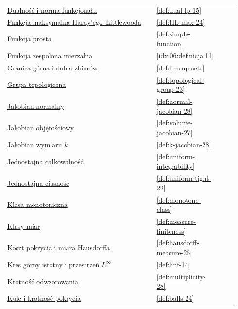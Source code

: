 \documentclass[11pt,a4paper,oneside]{book}
\numberwithin{equation}{chapter}
\theoremstyle{plain}
\theoremstyle{definition}
\theoremstyle{remark}
\begin{document}
\begin{longtable}{@{}p{0.72\linewidth}p{0.135\linewidth}p{0.08\linewidth}@{}}
\hyperref[def:dual-lp-15]{Dualność i norma funkcjonału} & \ref*{def:dual-lp-15} & \pageref*{def:dual-lp-15} \\
\hyperref[def:HL-max-24]{Funkcja maksymalna Hardy'ego--Littlewooda} & \ref*{def:HL-max-24} & \pageref*{def:HL-max-24} \\
\hyperref[def:simple-function]{Funkcja prosta} & \ref*{def:simple-function} & \pageref*{def:simple-function} \\
\hyperref[idx:06:definicja:11]{Funkcja zespolona mierzalna} & \ref*{idx:06:definicja:11} & \pageref*{idx:06:definicja:11} \\
\hyperref[def:limsup-sets]{Granica górna i dolna zbiorów} & \ref*{def:limsup-sets} & \pageref*{def:limsup-sets} \\
\hyperref[def:topological-group-23]{Grupa topologiczna} & \ref*{def:topological-group-23} & \pageref*{def:topological-group-23} \\
\hyperref[def:normal-jacobian-28]{Jakobian normalny} & \ref*{def:normal-jacobian-28} & \pageref*{def:normal-jacobian-28} \\
\hyperref[def:volume-jacobian-27]{Jakobian objętościowy} & \ref*{def:volume-jacobian-27} & \pageref*{def:volume-jacobian-27} \\
\hyperref[def:k-jacobian-28]{Jakobian wymiaru $k$} & \ref*{def:k-jacobian-28} & \pageref*{def:k-jacobian-28} \\
\hyperref[def:uniform-integrability]{Jednostajna całkowalność} & \ref*{def:uniform-integrability} & \pageref*{def:uniform-integrability} \\
\hyperref[def:uniform-tight-22]{Jednostajna ciasność} & \ref*{def:uniform-tight-22} & \pageref*{def:uniform-tight-22} \\
\hyperref[def:monotone-class]{Klasa monotoniczna} & \ref*{def:monotone-class} & \pageref*{def:monotone-class} \\
\hyperref[def:measure-finiteness]{Klasy miar} & \ref*{def:measure-finiteness} & \pageref*{def:measure-finiteness} \\
\hyperref[def:hausdorff-measure-26]{Koszt pokrycia i miara Hausdorffa} & \ref*{def:hausdorff-measure-26} & \pageref*{def:hausdorff-measure-26} \\
\hyperref[def:linf-14]{Kres górny istotny i przestrzeń $L^\infty$} & \ref*{def:linf-14} & \pageref*{def:linf-14} \\
\hyperref[def:multiplicity-28]{Krotność odwzorowania} & \ref*{def:multiplicity-28} & \pageref*{def:multiplicity-28} \\
\hyperref[def:balls-24]{Kule i krotność pokrycia} & \ref*{def:balls-24} & \pageref*{def:balls-24} \\

\end{longtable}
\end{document}

